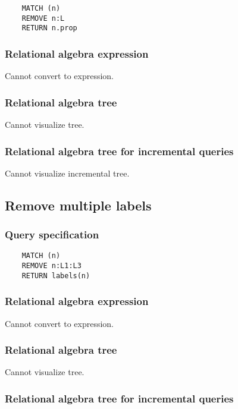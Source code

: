 	\begin{lstlisting}
	MATCH (n)
	REMOVE n:L
	RETURN n.prop
	\end{lstlisting}


	\subsubsection*{Relational algebra expression}

	Cannot convert to expression.

	\subsubsection*{Relational algebra tree}

	Cannot visualize tree.

	\subsubsection*{Relational algebra tree for incremental queries}

	Cannot visualize incremental tree.
	\subsection{Remove multiple labels}

	\subsubsection*{Query specification}

	\begin{lstlisting}
	MATCH (n)
	REMOVE n:L1:L3
	RETURN labels(n)
	\end{lstlisting}


	\subsubsection*{Relational algebra expression}

	Cannot convert to expression.

	\subsubsection*{Relational algebra tree}

	Cannot visualize tree.

	\subsubsection*{Relational algebra tree for incremental queries}

